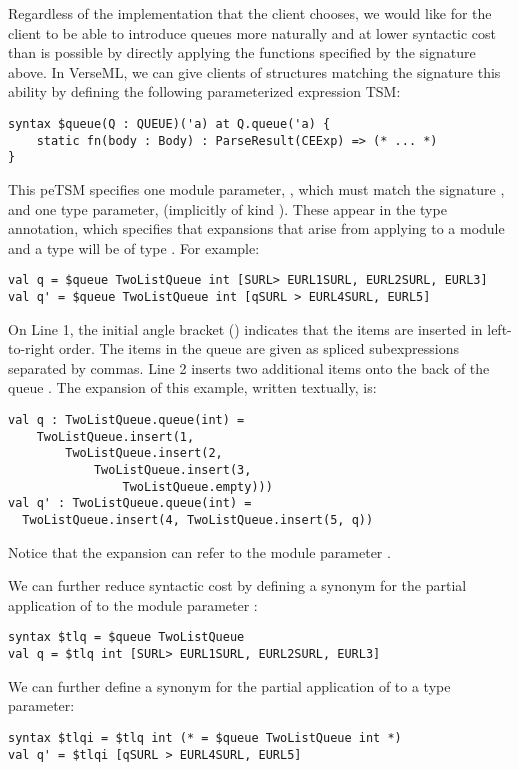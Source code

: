Regardless of the implementation that the client chooses, we would like for the client to be able to introduce queues more naturally and at lower syntactic cost than is possible by directly applying the functions specified by the signature above. In VerseML, we can give clients of structures matching the signature  this ability by defining the following parameterized expression TSM:
\begin{lstlisting}[numbers=none]
syntax $queue(Q : QUEUE)('a) at Q.queue('a) {
	static fn(body : Body) : ParseResult(CEExp) => (* ... *)
}
\end{lstlisting}
This peTSM specifies one module parameter, , which must match the signature , and one type parameter,  (implicitly of kind ). These appear in the type annotation, which specifies that expansions that arise from applying  to a module  and a type  will be of type . For example:
\begin{lstlisting}
val q = $queue TwoListQueue int [SURL> EURL1SURL, EURL2SURL, EURL3]
val q' = $queue TwoListQueue int [qSURL > EURL4SURL, EURL5]
\end{lstlisting}
On Line 1, the initial angle bracket () indicates that the items are inserted in left-to-right order. The items in the queue are given as spliced subexpressions separated by commas. Line 2 inserts two additional items onto the back of the queue . The expansion of this example, written textually, is:
\begin{lstlisting}
val q : TwoListQueue.queue(int) = 
	TwoListQueue.insert(1, 
		TwoListQueue.insert(2, 
			TwoListQueue.insert(3, 
				TwoListQueue.empty)))
val q' : TwoListQueue.queue(int) = 
  TwoListQueue.insert(4, TwoListQueue.insert(5, q))
\end{lstlisting}
Notice that the expansion can refer to the module parameter .

We can further reduce syntactic cost by defining a synonym for the partial application of  to the module parameter :
\begin{lstlisting}[numbers=none]
syntax $tlq = $queue TwoListQueue
val q = $tlq int [SURL> EURL1SURL, EURL2SURL, EURL3]
\end{lstlisting}
We can further define a synonym for the partial application of  to a type parameter:
\begin{lstlisting}[numbers=none]
syntax $tlqi = $tlq int (* = $queue TwoListQueue int *)
val q' = $tlqi [qSURL > EURL4SURL, EURL5]
\end{lstlisting}

